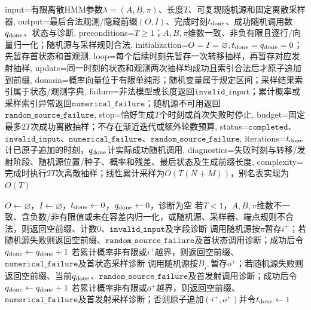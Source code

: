 \begin{AlgorithmContract}{
  input={有限离散HMM参数$\lambda=(A,B,\pi)$、长度$T$、可复现随机源和固定离散采样器},
  output={最后合法观测/隐藏前缀$(O,I)$、完成时刻$t_{\rm done}$、成功随机调用数$q_{\rm done}$、状态与诊断},
  preconditions={$T\ge1$；$A,B,\pi$维数一致、非负有限且逐行/向量归一化；随机源与采样规则合法},
  initialization={$O=I=\varnothing,t_{\rm done}=q_{\rm done}=0$；先暂存首状态和首观测},
  loop={每个后续时刻先暂存一次转移抽样，再暂存对应发射抽样},
  update={同一时刻的状态和观测两次抽样均成功且索引合法后才原子追加到前缀},
  domain={概率向量位于有限单纯形；随机变量属于规定区间；采样结果索引属于状态/观测字典},
  failure={非法模型或长度返回$\mathtt{invalid\_input}$；累计概率或采样索引异常返回$\mathtt{numerical\_failure}$；随机源不可用返回$\mathtt{random\_source\_failure}$},
  stop={恰好生成$T$个时刻或首次失败时停止},
  budget={固定最多$2T$次成功离散抽样；不存在渐近迭代或额外轮数预算},
  status={$\mathtt{completed}$、$\mathtt{invalid\_input}$、$\mathtt{numerical\_failure}$、$\mathtt{random\_source\_failure}$},
  iterations={$t_{\rm done}$计已原子追加的时刻，$q_{\rm done}$计实际成功随机调用},
  diagnostics={失败时刻与转移/发射阶段、随机源位置/种子、概率和残差、最后状态及生成前缀长度},
  complexity={完成时执行$2T$次离散抽样；线性累计采样为$O(T(N+M))$，别名表实现为$O(T)$}
}
\begin{algorithm}[H]
\caption{HMM观测序列生成}\label{alg:V3-C05-generate}
$O\leftarrow\varnothing$，$I\leftarrow\varnothing$，$t_{\rm done}\leftarrow0$，$q_{\rm done}\leftarrow0$，诊断为空\;
若$T<1$，$A,B,\pi$维数不一致、含负数/非有限值或未在容差内归一化，或随机源、采样器、端点规则不合法，则返回空前缀、计数$0$、$\mathtt{invalid\_input}$及字段诊断\;
调用随机源按$\pi$暂存$i^+$；若随机源失败则返回空前缀、$\mathtt{random\_source\_failure}$及首状态调用诊断；成功后令$q_{\rm done}\leftarrow q_{\rm done}+1$\;
若累计概率非有限或$i^+$越界，则返回空前缀、$\mathtt{numerical\_failure}$及首状态采样诊断\;
调用随机源按$B_{i^+}$暂存$o^+$；若随机源失败则返回空前缀、当前$q_{\rm done}$、$\mathtt{random\_source\_failure}$及首发射调用诊断；成功后令$q_{\rm done}\leftarrow q_{\rm done}+1$\;
若累计概率非有限或$o^+$越界，则返回空前缀、$\mathtt{numerical\_failure}$及首发射采样诊断；否则原子追加$(i^+,o^+)$并令$t_{\rm done}\leftarrow1$\;
\end{algorithm}
\end{AlgorithmContract}
